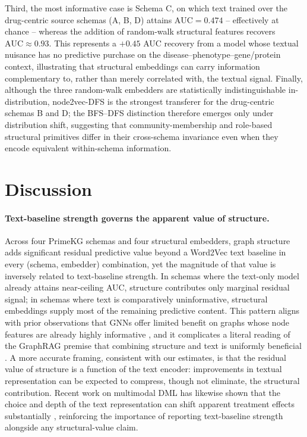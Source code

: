 \documentclass{article}
\theoremstyle{plain}
\theoremstyle{definition}
\theoremstyle{remark}
\begin{document}
Third, the most informative case is Schema C, on which text trained over the drug-centric source schemas (A, B, D) attains $\mathrm{AUC} = 0.474$ -- effectively at chance -- whereas the addition of random-walk structural features recovers $\mathrm{AUC} \approx 0.93$. This represents a $+0.45$ AUC recovery from a model whose textual nuisance has no predictive purchase on the disease--phenotype--gene/protein context, illustrating that structural embeddings can carry information complementary to, rather than merely correlated with, the textual signal. Finally, although the three random-walk embedders are statistically indistinguishable in-distribution, node2vec-DFS is the strongest transferer for the drug-centric schemas B and D; the BFS--DFS distinction therefore emerges only under distribution shift, suggesting that community-membership and role-based structural primitives differ in their cross-schema invariance even when they encode equivalent within-schema information.

\section{Discussion}

\paragraph{Text-baseline strength governs the apparent value of structure.}
Across four PrimeKG schemas and four structural embedders, graph structure adds significant residual predictive value beyond a Word2Vec text baseline in every (schema, embedder) combination, yet the magnitude of that value is inversely related to text-baseline strength. In schemas where the text-only model already attains near-ceiling AUC, structure contributes only marginal residual signal; in schemas where text is comparatively uninformative, structural embeddings supply most of the remaining predictive content. This pattern aligns with prior observations that GNNs offer limited benefit on graphs whose node features are already highly informative \citep{huang2023}, and it complicates a literal reading of the GraphRAG premise that combining structure and text is uniformly beneficial \citep{grag2024,mor2025}. A more accurate framing, consistent with our estimates, is that the residual value of structure is a function of the text encoder: improvements in textual representation can be expected to compress, though not eliminate, the structural contribution. Recent work on multimodal DML has likewise shown that the choice and depth of the text representation can shift apparent treatment effects substantially \citep{doublemldeep2024,doublelingo2024}, reinforcing the importance of reporting text-baseline strength alongside any structural-value claim.
\end{document}

